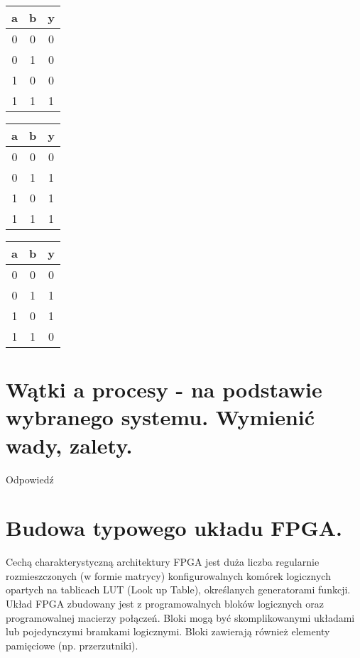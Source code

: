 \documentclass[12pt,a4paper]{article}
\begin{document}
	\begin{table}[!h]
		\centering
		\begin{subtable}{0.33\textwidth}
			\centering
			\begin{tabular}{ cc|c } 
				a & b & y \\ 
				\hline
				0 & 0 & 0 \\ 
				0 & 1 & 0 \\ 
				1 & 0 & 0 \\ 
				1 & 1 & 1 \\ 
			\end{tabular}
		\end{subtable}%
		\begin{subtable}{0.33\textwidth}
			\centering
			\begin{tabular}{ cc|c } 
				a & b & y \\ 
				\hline
				0 & 0 & 0 \\ 
				0 & 1 & 1 \\ 
				1 & 0 & 1 \\ 
				1 & 1 & 1 \\ 
			\end{tabular}
		\end{subtable}%
		\begin{subtable}{0.33\textwidth}
			\centering
			\begin{tabular}{ cc|c } 
				a & b & y \\ 
				\hline
				0 & 0 & 0 \\ 
				0 & 1 & 1 \\ 
				1 & 0 & 1 \\ 
				1 & 1 & 0 \\ 
			\end{tabular}
		\end{subtable}%
	\end{table} 

	\section{Wątki a procesy - na podstawie wybranego systemu. Wymienić wady, zalety.}
	Odpowiedź

	\section{Budowa typowego układu FPGA.}
	Cechą charakterystyczną architektury FPGA jest duża liczba regularnie rozmieszczonych (w formie matrycy) konfigurowalnych komórek logicznych opartych na tablicach LUT (Look up Table), określanych generatorami funkcji. Układ FPGA zbudowany jest z programowalnych bloków logicznych oraz programowalnej macierzy połączeń. Bloki mogą być skomplikowanymi układami lub pojedynczymi bramkami logicznymi. Bloki zawierają również elementy pamięciowe (np. przerzutniki).
\end{document}
